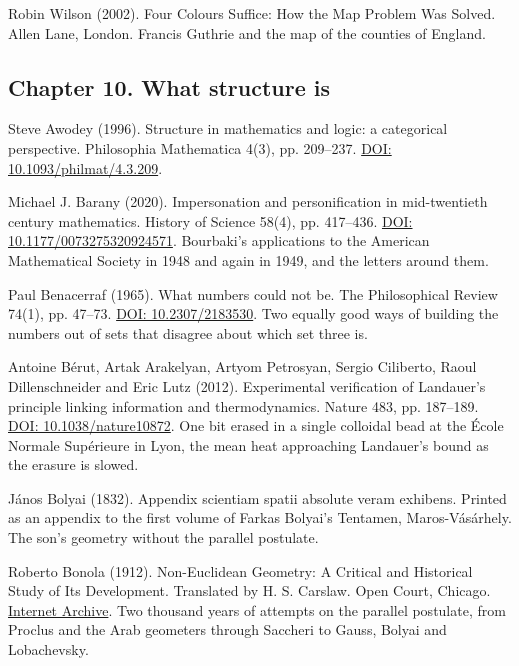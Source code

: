 \noindent Robin Wilson (2002). Four Colours Suffice: How the Map Problem Was Solved. Allen Lane, London. Francis Guthrie and the map of the counties of England.
\par\medskip

\subsection*{Chapter 10. What structure is}

\noindent Steve Awodey (1996). Structure in mathematics and logic: a categorical perspective. Philosophia Mathematica 4(3), pp. 209--237. \href{https://doi.org/10.1093/philmat/4.3.209}{DOI: 10.1093/philmat/4.3.209}.
\par\medskip

\noindent Michael J. Barany (2020). Impersonation and personification in mid-twentieth century mathematics. History of Science 58(4), pp. 417--436. \href{https://doi.org/10.1177/0073275320924571}{DOI: 10.1177/0073275320924571}. Bourbaki's applications to the American Mathematical Society in 1948 and again in 1949, and the letters around them.
\par\medskip

\noindent Paul Benacerraf (1965). What numbers could not be. The Philosophical Review 74(1), pp. 47--73. \href{https://doi.org/10.2307/2183530}{DOI: 10.2307/2183530}. Two equally good ways of building the numbers out of sets that disagree about which set three is.
\par\medskip

\noindent Antoine B\'erut, Artak Arakelyan, Artyom Petrosyan, Sergio Ciliberto, Raoul Dillenschneider and Eric Lutz (2012). Experimental verification of Landauer's principle linking information and thermodynamics. Nature 483, pp. 187--189. \href{https://doi.org/10.1038/nature10872}{DOI: 10.1038/nature10872}. One bit erased in a single colloidal bead at the \'Ecole Normale Sup\'erieure in Lyon, the mean heat approaching Landauer's bound as the erasure is slowed.
\par\medskip

\noindent J\'anos Bolyai (1832). Appendix scientiam spatii absolute veram exhibens. Printed as an appendix to the first volume of Farkas Bolyai's Tentamen, Maros-V\'as\'arhely. The son's geometry without the parallel postulate.
\par\medskip

\noindent Roberto Bonola (1912). Non-Euclidean Geometry: A Critical and Historical Study of Its Development. Translated by H. S. Carslaw. Open Court, Chicago. \href{https://archive.org/details/noneuclideangeom00bonouoft}{Internet Archive}. Two thousand years of attempts on the parallel postulate, from Proclus and the Arab geometers through Saccheri to Gauss, Bolyai and Lobachevsky.
\par\medskip

